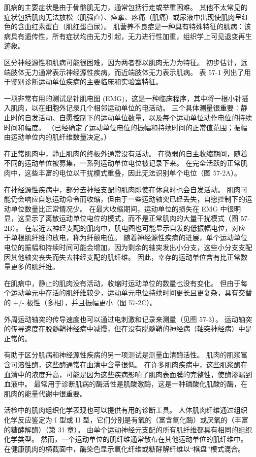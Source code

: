 肌病的主要症状是由于骨骼肌无力，通常包括行走或举重困难。 其他不太常见的症状包括肌肉无法放松（肌强直）、痉挛、疼痛（肌痛）或尿液中出现使肌肉呈红色的含血红素蛋白（肌红蛋白尿）。 肌营养不良症是一种具有特殊特征的肌病：该病具有遗传性，所有症状均由无力引起，无力进行性加重，组织学上可见退变再生迹象。

区分神经源性和肌病可能很困难，因为两者都以肌肉无力为特征。 初步估计，远端肢体无力通常表示神经源性疾病，而近端肢体无力表示肌病。 表 57-1 列出了用于鉴别诊断运动单位疾病的主要临床和实验室特征。

一项非常有用的测试是针肌电图 (EMG)，这是一种临床程序，其中将一根小针插入肌肉，以在细胞外记录几个相邻运动单位的电活动。 三个具体测量很重要：静止时的自发活动、自愿控制下的运动单位数量，以及每个运动单位动作电位的持续时间和幅度。 （已经确定了运动单位电位的振幅和持续时间的正常值范围；振幅由运动单位内的肌纤维数量决定。）

在正常肌肉中，静止肌肉的终板外通常没有活动。 在微弱的自主收缩期间，随着不同的运动单位被募集，一系列运动单位电位被记录下来。 在完全活跃的正常肌肉中，这些丰富的电位以干扰模式重叠，因此无法识别单个电位（图 57-2A）。

在神经源性疾病中，部分去神经支配的肌肉即使在休息时也会自发活动。 肌肉可能仍会响应自愿运动命令而收缩，但由于一些运动轴突已经丢失，自愿控制下的运动单位数量比正常情况少。 在最大收缩期间，运动单位的损失在 EMG 中很明显，这显示了离散运动单位电位的模式，而不是正常肌肉的大量干扰模式（图 57-2B）。 在最近去神经支配的肌肉中，肌电图也可能显示自发的低振幅电位，对应于单根肌纤维的放电，称为纤颤电位。 随着神经源性疾病的进展，单个运动单位电位的振幅和持续时间可能会增加，因为剩余的轴突发出小分支，这些小分支支配因其他轴突丧失而失去神经支配的肌纤维。 因此，幸存的运动单位含有比正常数量更多的肌纤维。

在肌病中，静止的肌肉没有活动，收缩时运动单位的数量也没有变化。 但由于每个运动单元中存活的肌纤维较少，运动单元电位持续时间更长且更复杂，具有交替的 +/- 极性（多相），并且振幅更小（图 57-2C）。

外周运动轴突的传导速度也可以通过电刺激和记录来测量（见图 57-3）。 运动轴突的传导速度在脱髓鞘神经病中减慢，但在没有脱髓鞘的神经病（轴突神经病）中是正常的。

有助于区分肌病和神经源性疾病的另一项测试是测量血清酶活性。 肌肉的肌浆富含可溶性酶，这些酶通常在血清中含量很低。 在许多肌肉疾病中，这些肌浆酶在血清中的浓度升高，可能是因为这些疾病影响了肌肉表面膜的完整性，使酶渗漏到血液中。 最常用于诊断肌病的酶活性是肌酸激酶，这是一种磷酸化肌酸的酶，在肌肉的能量代谢中很重要。

活检中的肌肉组织化学表现也可以提供有用的诊断工具。 人体肌肉纤维通过组织化学反应鉴定为 I 型或 II 型，它们分别是有氧的（富含氧化酶）或厌氧的（丰富的糖酵解酶）（第 31 章）。 由单个运动神经元支配的所有肌纤维都具有相同的组织化学类型。 然而，一个运动单位的肌纤维通常散布在其他运动单位的肌纤维中。 在健康肌肉的横截面中，酶染色显示氧化纤维或糖酵解纤维以“棋盘”模式混合。

